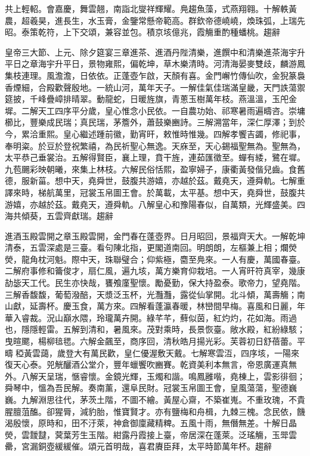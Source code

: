 \begin{pinyinscope}
共上輕軺。會嘉慶，舞雲翹，南詣北燮祥輝耀。鳧趨魚藻，式燕翔翱。十解軼黃農，超羲昊，進長生，水玉膏，金鑒常懸帝範高。群欽帝德嶢嶢，煥珠弧，上瑞先昭。泰策乾符，上下交頌，兼容並包。積京垓億兆，霞觴重酌種蟠桃。趨辭

皇帝三大節、上元、除夕筵宴三章進茶、進酒丹陛清樂，進饌中和清樂進茶海宇升平日之章海宇升平日，景物雍熙，偏乾坤，草木樂清時。河清海晏麥雙歧，麟游鳳集枝連理。風澹澹，日依依。正蓬壺乍啟，天顏有喜。金門嶰竹傳仙吹，金猊篆裊香煙細，合殿歡聲殷地。一統山河，萬年天子。一解佳氣佳瑞滿皇畿，天門詄蕩禦筵披，千峰疊嶂排晴翠。動龍蛇，日暖旌旗，青蔥玉樹萬年枝。燕溫溫，玉戺金墀。二解天工四序平分歲，皇心惟念小民依。一自農功始、祁寒暑雨遍疇咨。崇墉櫛比，豐樂成民瑞；真民瑞，茅簷外，蕭鼓樂豳詩。三解溯當年，深仁厚澤；到於今，累洽重熙。皇心繼述踵前徽，勤宵旰，敕惟時惟幾。四解孝饗吉蠲，修祀事，奉明粢。於豆於登祝繁禧，為民祈聖心無逸。天庥至，天心錫福聖無為。聖無為，太平恭己垂裳治。五解得賢臣，襄上理，賁干旌，連茹匯徵至。蟬有緌，鷺在墀。九苞颺彩映朝曦，來集上林枝。六解民俗恬熙，盈寧婦子，康衢黃發偕兒齒。食舊德，服新菑。想中天，堯舜世，鼓腹共游嬉，亦越於茲。戴堯天，遵舜軌。七解重譯來時，梯航萬里，冠裳玉帛圖王會。於萬載，太平基。想中天，堯舜世，鼓腹共游嬉，亦越於茲。戴堯天，遵舜軌。八解皇心和豫陽春似，自萬類，光輝盛美。四海共傾葵，五雲齊獻瑞。趨辭

進酒玉殿雲開之章玉殿雲開，金門春在蓬壺界。日月昭回，景福齊天大。一解乾坤清泰，五雲深處是三臺。看句陳北指，更閣道南回。明朗朗，左樞兼上相；爛熒熒，龍角枕河魁。際中天，珠聯璧合；仰紫極，麕至鳧來。一人有慶，萬國春臺。二解府事修和籥俊才，扇仁風，遍九垓，萬方樂育仰栽培。一人宵旰符真宰，幾康劼毖天工代。民生亦快哉，饔飧廑聖懷。勵憂勤，保大持盈泰。歌帝力，望堯階。三解香馥馥，葡萄潑醅，天漿泛玉杯，光灩灩，露從仙掌開。北斗傾，萬壽觴；南山獻，延壽杯。慶玉食，萬方來。四解看蓬瀛春暖，林巒間早梅。喜風和日麗，年華入睿裁。況山巔水隈，玲瓏萬卉開。綠芊芊，蘚似茵，紅灼灼，花如海。雨過也，隱隱輕雷。五解到清和，暑風來。茂對乘時，長景恢臺。敞水殿，紅紛綠駭；曳暄颸，楊柳毰毸。六解金飆至，商序回，清秋皓月揚光彩。芙蓉初日舒蓓蕾。平疇稏黃雲藹，歲登大有萬民歡，皇仁優渥敷天戴。七解寒雲沍，四序垓，一陽來復天心泰。兕觥釃酒公堂介，豐年蠟饗吹豳賽。乾資美利本無言，帝恩廣運真無外。八解天呈瑞，愜睿懷。金鏡光輝，玉燭和諧。鳴鳳雝喈，堯棟上，雲影徘徊；舜琴中，慍為吾民解。奏南薰，還阜民財。冠裳玉帛圖王會，皇風蕩蕩，聖德巍巍。九解淵思往代，茅茨土階，不圖不繪。黃屋心齋，不築崔嵬。不重玫瑰，不貴腥膻菹醢。卻猩脣，減豹胎，惟寶賢才。亦有鹽梅和舟楫，九棘三槐。念民依，饑渴殷懷，原時和，田不汙萊，神倉御廩藏精粺。五風十雨，無僭無差。十解日晶熒，雲靉靆，蓂葉芳生玉階。紺露丹霞接上臺，帝居深在蓬萊。泛瑤觴，玉斝雲罍，宮漏銅壺緩緩催。頌元首明哉，喜君賡臣拜，太平時節萬年杯。趨辭


\end{pinyinscope}
